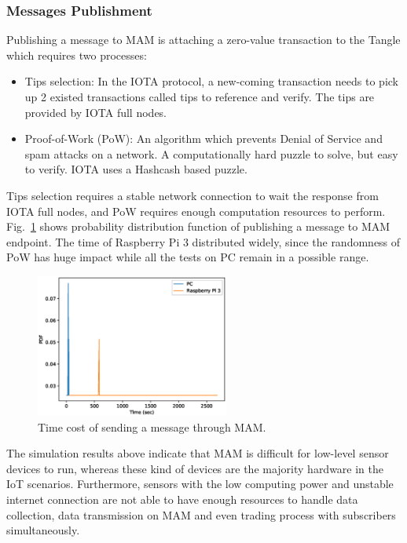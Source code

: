 \documentclass[conference]{IEEEtran}
\begin{document}
\subsubsection{Messages Publishment}
Publishing a message to MAM is attaching a zero-value transaction to the Tangle which requires two processes:
\begin{itemize}
	\item	Tips selection: In the IOTA protocol, a new-coming transaction needs to pick up 2 existed transactions called tips to reference and verify. The tips are provided by IOTA full nodes.
	\item	Proof-of-Work (PoW): An algorithm which prevents Denial of Service and spam attacks on a network. A computationally hard puzzle to solve, but easy to verify. IOTA uses a Hashcash\cite{Hashcash} based puzzle.
\end{itemize}

Tips selection requires a stable network connection to wait the response from IOTA full nodes, and PoW requires enough computation resources to perform. Fig.~\ref{fig:mam_send} shows probability distribution function of publishing a message to MAM endpoint. The time of Raspberry Pi 3 distributed widely, since the randomness of PoW has huge impact while all the tests on PC remain in a possible range.

\begin{figure}[!t]
    \centering
    \includegraphics[width=2.5in]{mam_send}
    \caption{Time cost of sending a message through MAM.}
    \label{fig:mam_send}
\end{figure}

The simulation results above indicate that MAM is difficult for low-level sensor devices to run, whereas these kind of devices are the majority hardware in the IoT scenarios. Furthermore, sensors with the low computing power and unstable internet connection are not able to have enough resources to handle data collection, data transmission on MAM and even trading process with subscribers simultaneously. 
\end{document}
